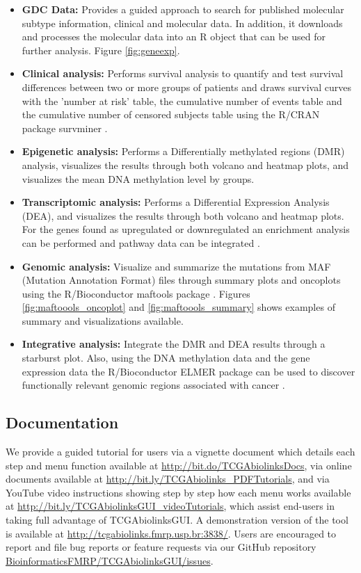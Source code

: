 \begin{itemize}
	\item \textbf{GDC Data:} Provides a guided approach to search for published molecular subtype information, clinical and molecular data. In addition, it downloads and processes the molecular data into an R object that can be used for further analysis. Figure \ref{fig:geneexp}.
	\item \textbf{Clinical analysis:} Performs survival analysis to quantify and test survival differences between two or more groups of patients and draws survival curves with the 'number at risk' table, the cumulative number of events table and the cumulative number of censored subjects table using the R/CRAN package survminer \cite{survminer}.
	\item \textbf{Epigenetic analysis:} Performs a Differentially methylated regions (DMR) analysis, visualizes the results through both volcano and heatmap plots, and visualizes the mean DNA methylation level by groups.
	\item \textbf{Transcriptomic analysis:} Performs a Differential Expression Analysis (DEA), and visualizes the results through both volcano and heatmap plots. For the genes found as upregulated or downregulated an enrichment analysis can be performed and pathway data can be integrated \cite{luo2013pathview}.
 	\item \textbf{Genomic analysis:} Visualize and summarize the mutations from MAF (Mutation Annotation Format) files through summary plots and oncoplots using the R/Bioconductor maftools package \cite{Gu20052016,Maftools}.
  Figures \ref{fig:maftoools_oncoplot} and \ref{fig:maftoools_summary} shows examples of summary and visualizations available.
	\item \textbf{Integrative analysis:} Integrate the DMR and DEA results through a starburst plot. Also, using the DNA methylation data and the gene expression data the R/Bioconductor ELMER package can be used to discover functionally relevant genomic regions associated with cancer \cite{yao2015inferring, ELMER2}.
\end{itemize}

\subsection{Documentation}

We provide a guided tutorial for users via a vignette document which details each step and menu function available at \href{http://bit.do/TCGAbiolinksDocs}{http://bit.do/TCGAbiolinksDocs}, via online documents available at
\href{http://bit.ly/TCGAbiolinks\_PDFTutorials}{http://bit.ly/TCGAbiolinks\_PDFTutorials}, and via YouTube video instructions showing step by step how each menu works available at \href{http://bit.ly/TCGAbiolinksGUI\_videoTutorials}{http://bit.ly/TCGAbiolinksGUI\_videoTutorials}, which assist end-users in taking full advantage of TCGAbiolinksGUI. A demonstration version of the tool is available at \href{http://tcgabiolinks.fmrp.usp.br:3838/}{http://tcgabiolinks.fmrp.usp.br:3838/}. Users are encouraged to report and file bug reports or feature requests via our GitHub repository \href{https://github.com/BioinformaticsFMRP/TCGAbiolinksGUI/issues}{BioinformaticsFMRP/TCGAbiolinksGUI/issues}.

